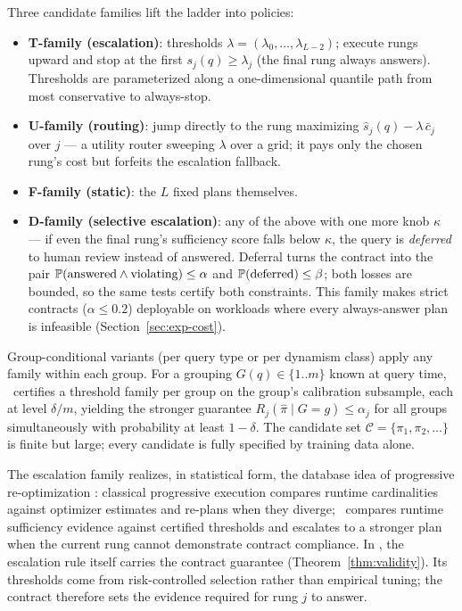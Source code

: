 Three candidate families lift the ladder into policies:
\begin{itemize}
\item \textbf{T-family (escalation)}: thresholds
$\lambda = (\lambda_0, \dots, \lambda_{L-2})$; execute rungs upward and
stop at the first $s_j(q) \ge \lambda_j$ (the final rung always
answers). Thresholds are parameterized along a one-dimensional quantile
path from most conservative to always-stop.
\item \textbf{U-family (routing)}: jump directly to the rung
maximizing $\hat{s}_j(q) - \lambda\, \bar{c}_j$ over $j$ --- a utility
router
sweeping $\lambda$ over a grid; it pays only the chosen rung's cost but
forfeits the escalation fallback.
\item \textbf{F-family (static)}: the $L$ fixed plans themselves.
\item \textbf{D-family (selective escalation)}: any of the above with
one more knob $\kappa$ --- if even the final rung's sufficiency score
falls below $\kappa$, the query is \emph{deferred} to human review
instead of answered. Deferral turns the contract into the pair
$\mathbb{P}(\text{answered} \wedge \text{violating}) \le \alpha$ and
$\mathbb{P}(\text{deferred}) \le \beta$; both losses are bounded, so the same
tests certify both constraints. This family makes strict contracts
($\alpha \le 0.2$) deployable on workloads
where every always-answer plan is infeasible
(Section~\ref{sec:exp-cost}).
\end{itemize}
Group-conditional variants (per query type or per dynamism class) apply
any family within each group. For a grouping $G(q) \in \{1..m\}$ known
at query time, \system\ certifies a threshold family per group on the
group's calibration subsample, each at level $\delta/m$, yielding the
stronger guarantee $R_j(\hat\pi \mid G = g) \le \alpha_j$ for all
groups simultaneously with probability at least $1-\delta$. The
candidate set $\mathcal{C} = \{\pi_1, \pi_2, \dots\}$ is finite but
large; every candidate is fully specified by training data alone.

The escalation family realizes, in statistical form, the database idea
of progressive re-optimization
\citep{kabra1998efficient,markl2004robust}: classical progressive
execution compares runtime cardinalities against optimizer estimates
and re-plans when they diverge; \system\ compares runtime sufficiency
evidence against certified thresholds and escalates to a stronger plan
when the current rung cannot demonstrate contract compliance. In
\system, the escalation rule itself carries the contract guarantee
(Theorem~\ref{thm:validity}). Its thresholds come from risk-controlled
selection rather than empirical tuning; the contract therefore sets the
evidence required for rung $j$ to answer.


